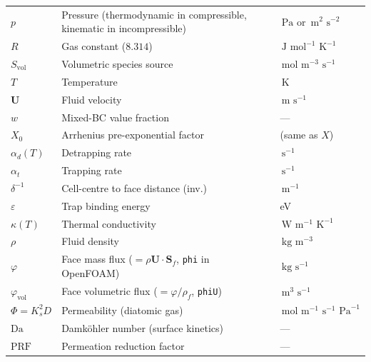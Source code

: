 \documentclass[11pt,a4paper]{article}
\newcommand{\mol}{\,\text{mol}}
\newcommand{\m}{\,\text{m}}
\newcommand{\K}{\,\text{K}}
\newcommand{\s}{\,\text{s}}
\newcommand{\Pa}{\,\text{Pa}}
\newcommand{\J}{\,\text{J}}
\newcommand{\W}{\,\text{W}}
\newcommand{\kg}{\,\text{kg}}
\newcommand{\Da}{\mathrm{Da}}
\begin{document}
\begin{center}
\begin{tabular}{lll}
$p$               & Pressure (thermodynamic in compressible, kinematic in incompressible) & $\Pa$ or $\m^2\,\s^{-2}$ \\
$R$               & Gas constant ($8.314$)               & $\J\,\mol^{-1}\,\K^{-1}$ \\
$S_\text{vol}$    & Volumetric species source            & $\mol\,\m^{-3}\,\s^{-1}$ \\
$T$               & Temperature                          & $\K$ \\
$\mathbf{U}$      & Fluid velocity                       & $\m\,\s^{-1}$ \\
$w$               & Mixed-BC value fraction              & --- \\
$X_0$             & Arrhenius pre-exponential factor     & (same as $X$) \\
$\alpha_d(T)$     & Detrapping rate                     & $\s^{-1}$ \\
$\alpha_t$        & Trapping rate                       & $\s^{-1}$ \\
$\delta^{-1}$     & Cell-centre to face distance (inv.) & $\m^{-1}$ \\
$\varepsilon$     & Trap binding energy                  & eV \\
$\kappa(T)$       & Thermal conductivity                 & $\W\,\m^{-1}\,\K^{-1}$ \\
$\rho$            & Fluid density                        & $\kg\,\m^{-3}$ \\
$\varphi$         & Face mass flux ($= \rho\mathbf{U}\cdot\mathbf{S}_f$, \texttt{phi} in OpenFOAM) & $\kg\,\s^{-1}$ \\
$\varphi_\text{vol}$ & Face volumetric flux ($= \varphi/\rho_f$, \texttt{phiU}) & $\m^3\,\s^{-1}$ \\
$\Phi = K_s^2 D$  & Permeability (diatomic gas)          & $\mol\,\m^{-1}\,\s^{-1}\,\Pa^{-1}$ \\
$\Da$             & Damköhler number (surface kinetics) & --- \\
$\mathrm{PRF}$    & Permeation reduction factor          & --- \\
\bottomrule
\end{tabular}
\end{center}


\end{document}
